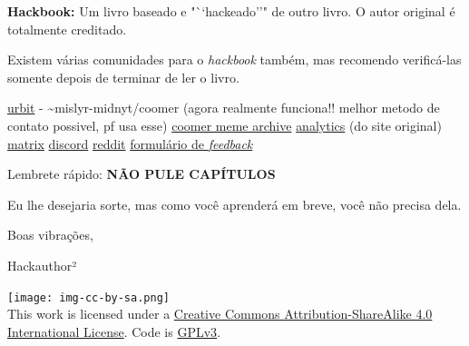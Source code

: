 \documentclass[
  spanish,
  openany]{book}
\let\oldhref\href
\renewcommand{\href}[2]{\textcolor{linkcolor}{\oldhref{#1}{#2}}}
\begin{document}
{\textbf{Hackbook:} Um livro baseado e "``hackeado''" de outro livro. O autor original é totalmente creditado. }

Existem várias comunidades para o \emph{hackbook} também, mas recomendo verificá-las somente depois de terminar de ler o livro.

\href{https://urbit.org}{urbit} - \textasciitilde mislyr-midnyt/coomer (agora realmente funciona!! melhor metodo de contato possivel, pf usa esse) \textbar{} \href{https://coomer.org}{coomer meme archive} \textbar{} \href{https://plausible.io/easypeasymethod.org}{analytics} (do site original) \textbar{} \href{https://matrix.to/\#/!xmJZznbJXuwzEGSEti:matrix.org?via=matrix.org}{matrix} \textbar{} \href{https://discord.com/invite/bCXEnf9}{discord} \textbar{} \href{https://reddit.com/r/pmohackbook}{reddit} \textbar{} \href{https://forms.gle/p7cTxowaNpKqgi5Z7}{formulário de \emph{feedback}}

Lembrete rápido: {\textbf{NÃO PULE CAPÍTULOS}}

Eu lhe desejaria sorte, mas como você aprenderá em breve, você não precisa dela.

Boas vibrações,

Hackauthor²

\texttt{[image: img-cc-by-sa.png]}\\

This work is licensed under a \href{https://creativecommons.org/licenses/by-sa/4.0/}{Creative Commons Attribution-ShareAlike 4.0 International License}. Code is \href{https://gitlab.com/snuggy/easypeasy/-/blob/master/LICENSE}{GPLv3}.
\end{document}
